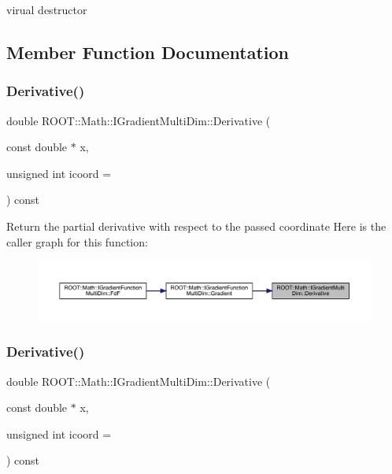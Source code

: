 virual destructor 



\subsection{Member Function Documentation}
\mbox{\label{classROOT_1_1Math_1_1IGradientMultiDim_ae131d6cc942c8fcf90a3b575335b30a7}} 
\subsubsection{\texorpdfstring{Derivative()}{Derivative()}\hspace{0.1cm}{\footnotesize\ttfamily [1/2]}}
{\footnotesize\ttfamily double R\+O\+O\+T\+::\+Math\+::\+I\+Gradient\+Multi\+Dim\+::\+Derivative (\begin{DoxyParamCaption}\item[{const double $\ast$}]{x,  }\item[{unsigned int}]{icoord = {} }\end{DoxyParamCaption}) const\hspace{0.3cm}{\ttfamily [inline]}}

Return the partial derivative with respect to the passed coordinate Here is the caller graph for this function\+:\nopagebreak
\begin{figure}[H]
\begin{center}
\leavevmode
\includegraphics[width=350pt]{d1/d71/classROOT_1_1Math_1_1IGradientMultiDim_ae131d6cc942c8fcf90a3b575335b30a7_icgraph}
\end{center}
\end{figure}
\mbox{\label{classROOT_1_1Math_1_1IGradientMultiDim_ae131d6cc942c8fcf90a3b575335b30a7}} 
\subsubsection{\texorpdfstring{Derivative()}{Derivative()}\hspace{0.1cm}{\footnotesize\ttfamily [2/2]}}
{\footnotesize\ttfamily double R\+O\+O\+T\+::\+Math\+::\+I\+Gradient\+Multi\+Dim\+::\+Derivative (\begin{DoxyParamCaption}\item[{const double $\ast$}]{x,  }\item[{unsigned int}]{icoord = {} }\end{DoxyParamCaption}) const\hspace{0.3cm}{\ttfamily [inline]}}

